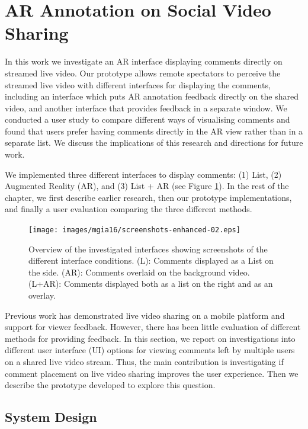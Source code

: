 
\section{AR Annotation on Social Video Sharing}
\label{sec:video}

In this work \cite{Nassani2016} we investigate an AR interface displaying comments directly on streamed live video. Our prototype allows remote spectators to perceive the streamed live video with different interfaces for displaying the comments, including an interface which puts AR annotation feedback directly on the shared video, and another interface that provides feedback in a separate window. We conducted a user study to compare different ways of visualising comments and found that users prefer having comments directly in the AR view rather than in a separate list. We discuss the implications of this research and directions for future work.

We implemented three different interfaces to display comments: (1) List, (2) Augmented Reality (AR), and (3) List + AR (see Figure \ref{fig:mgia16:conditions}). In the rest of the chapter, we first describe earlier research, then our prototype implementations, and finally a user evaluation comparing the three different methods.

\begin{figure}
  \texttt{[image: images/mgia16/screenshots-enhanced-02.eps]}
  \caption{Overview of the investigated interfaces showing screenshots of the different interface conditions. (L): Comments displayed as a List on the side. (AR): Comments overlaid on the background video. (L+AR): Comments displayed both as a list on the right and as an overlay. }
  \label{fig:mgia16:conditions}
\end{figure}

Previous work has demonstrated live video sharing on a mobile platform and support for viewer feedback. However, there has been little evaluation of different methods for providing feedback. In this section, we report on investigations into different user interface (UI) options for viewing comments left by multiple users on a shared live video stream. Thus, the main contribution is investigating if comment placement on live video sharing improves the user experience. Then we describe the prototype developed to explore this question.

\subsection{System Design}

